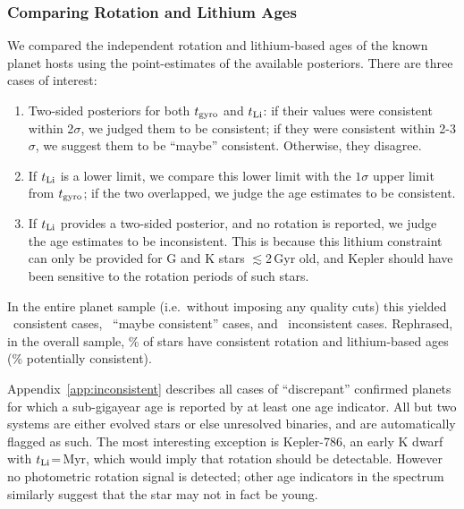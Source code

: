 \documentclass[11pt,twocolumn,tighten]{aastex63}
\begin{document}
\subsubsection{Comparing Rotation and Lithium Ages}

We compared the independent rotation and lithium-based ages of the
known planet hosts using the point-estimates of the available
posteriors.  There are three cases of interest:

\begin{enumerate}[leftmargin=*,topsep=0pt,itemsep=-1ex,partopsep=1ex,parsep=1ex]
  \item Two-sided posteriors for both $t_{\rm gyro}$ and $t_{\rm Li}$:
    if their values were consistent within 2$\sigma$, we judged them
    to be consistent; if they were consistent within 2-3$\sigma$, we
    suggest them to be ``maybe'' consistent.  Otherwise, they
    disagree.
  \item If $t_{\rm Li}$ is a lower limit, we compare this lower limit
    with the $1\sigma$ upper limit from $t_{\rm gyro}$; if the two
    overlapped, we judge the age estimates to be consistent.
  \item If $t_{\rm Li}$ provides a two-sided posterior, and no
    rotation is reported, we judge the age estimates to be
    inconsistent.  This is because this lithium constraint can only be
    provided for G and K stars $\lesssim$2\,Gyr old, and Kepler should
    have been sensitive to the rotation periods of such stars.
\end{enumerate}

In the entire planet sample (i.e.~without imposing any quality cuts) this
yielded \allagesyesconsistent\ consistent cases,
\allagesmaybeconsistent\ ``maybe consistent'' cases, and
\allagesnoconsistent\ inconsistent cases.  Rephrased, in the overall
sample, \fracconsistentallages\% of stars have consistent rotation and
lithium-based ages (\fracpotentiallyconsistentallages\% potentially
consistent).

Appendix~\ref{app:inconsistent} describes all cases of ``discrepant''
confirmed planets for which a sub-gigayear age is reported by at least
one age indicator.  All but two systems are either evolved stars or
else unresolved binaries, and are automatically flagged as such.  The
most interesting exception is Kepler-786,
an early K dwarf with $t_{\rm
Li}$=\kepseveneightsix\,Myr, which would imply that rotation should be
detectable.  However no photometric rotation signal is detected; other
age indicators in the spectrum similarly suggest that the star may not
in fact be young. 
\end{document}
